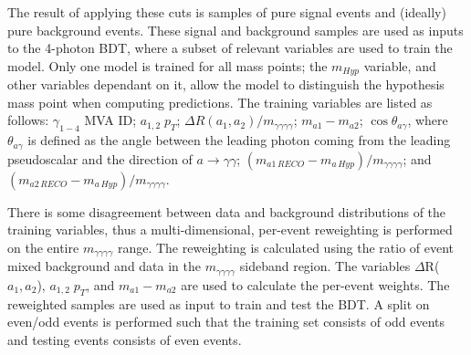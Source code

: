 \documentclass[12pt]{article}
\begin{document}
The result of applying these cuts is samples of pure signal events and (ideally) pure background events. These signal and background samples are used as inputs to the 4-photon BDT, where a subset of relevant variables are used to train the model. Only one model is trained for all mass points; the $m_{Hyp}$ variable, and other variables dependant on it, allow the model to distinguish the hypothesis mass point when computing predictions. The training variables are listed as follows: $\gamma_{1-4}$ MVA ID; $a_{1,2}\; p_T$; $\Delta R(a_{1}, a_{2})/m_{\gamma\gamma\gamma\gamma}$; $m_{a1} - m_{a2}$; $\cos\theta_{a\gamma}$, where $\theta_{a\gamma}$ is defined as the angle between the leading photon coming from the leading pseudoscalar and the direction of $a\rightarrow\gamma\gamma$; $(m_{a1\,RECO} - m_{a\, Hyp})/m_{\gamma\gamma\gamma\gamma}$; and $(m_{a2\,RECO} - m_{a\, Hyp})/m_{\gamma\gamma\gamma\gamma}$.



There is some disagreement between data and background distributions of the training variables, thus a multi-dimensional, per-event reweighting is performed on the entire $m_{\gamma\gamma\gamma\gamma}$ range. The reweighting is calculated using the ratio of event mixed background and data in the $m_{\gamma\gamma\gamma\gamma}$ sideband region. The variables $\Delta$R($a_1,a_2$), $a_{1,2}\; p_T$, and $m_{a1} - m_{a2}$ are used to calculate the per-event weights. The reweighted samples are used as input to train and test the BDT. A split on even/odd events is performed such that the training set consists of odd events and testing events consists of even events.\par
\end{document}
